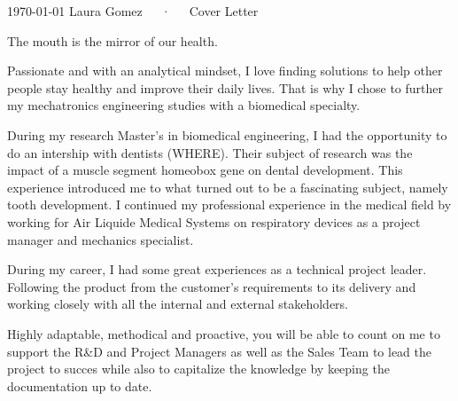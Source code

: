 \documentclass[11pt, a4paper]{awesome-cv}
\begin{document}
\makecvheader[R]

\makecvfooter
  {\today}
  {Laura Gomez~~~·~~~Cover Letter}
  {}

\makelettertitle

\begin{cvletter}


The mouth is the mirror of our health.

Passionate and with an analytical mindset, I love finding solutions to help other people stay healthy and improve their daily lives.
That is why I chose to further my mechatronics engineering studies with a biomedical specialty. 

During my research Master's in biomedical engineering, I had the opportunity to do an intership with dentists (WHERE). 
Their subject of research was the impact of a muscle segment homeobox gene on dental development. 
This experience introduced me to what turned out to be a fascinating subject, namely tooth development. 
I continued my professional experience in the medical field by working for Air Liquide Medical Systems on respiratory devices as a project manager and mechanics specialist.

During my career, I had some great experiences as a technical project leader. 
Following the product from the customer's requirements to its delivery and working closely with all the internal and external stakeholders.

Highly adaptable, methodical and proactive, you will be able to count on me to support the R\&D and Project Managers as well as the Sales Team
to lead the project to succes while also to capitalize the knowledge by keeping the documentation up to date. 


\end{cvletter}
\end{document}
